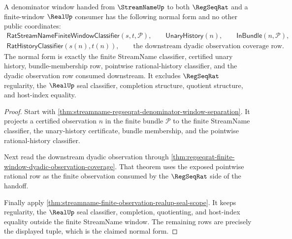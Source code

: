 \begin{theorem}
\label{thm:streamname-realup-denominator-window-normal-form}
A denominator window handed from $\StreamNameUp$ to both $\RegSeqRat$ and a
finite-window $\RealUp$ consumer has the following normal form and no other
public coordinates:
$$
\begin{gathered}
\mathsf{RatStreamNameFiniteWindowClassifier}(s,t,\mathcal P),\qquad
\mathsf{UnaryHistory}(n),\qquad
\mathsf{InBundle}(n,\mathcal P),\\
\mathsf{RatHistoryClassifier}(s(n),t(n)),\qquad
\text{the downstream dyadic observation coverage row.}
\end{gathered}
$$
The normal form is exactly the finite StreamName classifier, certified unary
history, bundle-membership row, pointwise rational-history classifier, and the
dyadic observation row consumed downstream. It excludes $\RegSeqRat$
regularity, the $\RealUp$ seal classifier, completion structure, quotient
structure, and host-index equality.
\end{theorem}
\begin{proof}
Start with
\autoref{thm:streamname-regseqrat-denominator-window-separation}. It projects a
certified observation $n$ in the finite bundle $\mathcal P$ to the finite
StreamName classifier, the unary-history certificate, bundle membership, and
the pointwise rational-history classifier.

Next read the downstream dyadic observation through
\autoref{thm:regseqrat-finite-window-dyadic-observation-coverage}. That theorem
uses the exposed pointwise rational row as the finite observation consumed by
the $\RegSeqRat$ side of the handoff.

Finally apply
\autoref{thm:streamname-finite-observation-realup-seal-scope}. It keeps
regularity, the $\RealUp$ seal classifier, completion, quotienting, and
host-index equality outside the finite StreamName window. The remaining rows
are precisely the displayed tuple, which is the claimed normal form.
\end{proof}

